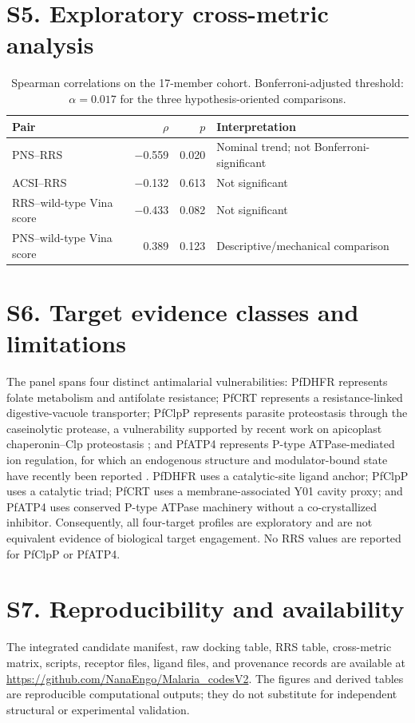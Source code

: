 \documentclass[journal=jcisd8,manuscript=suppinfo]{achemso}
\begin{document}
\section*{S5. Exploratory cross-metric analysis}
\begin{table}[h]
\centering
\caption{Spearman correlations on the 17-member cohort. Bonferroni-adjusted threshold: $\alpha=\num{0.017}$ for the three hypothesis-oriented comparisons.}
\label{tab:crossmetric}
\begin{tabular}{@{}lrrl@{}}
\toprule
Pair & $\rho$ & $p$ & Interpretation \\
\midrule
PNS--RRS & \num{-0.559} & \num{0.020} & Nominal trend; not Bonferroni-significant \\
ACSI--RRS & \num{-0.132} & \num{0.613} & Not significant \\
RRS--wild-type Vina score & \num{-0.433} & \num{0.082} & Not significant \\
PNS--wild-type Vina score & \num{0.389} & \num{0.123} & Descriptive/mechanical comparison \\
\bottomrule
\end{tabular}
\end{table}

\section*{S6. Target evidence classes and limitations}
The panel spans four distinct antimalarial vulnerabilities: PfDHFR represents folate metabolism and antifolate resistance; PfCRT represents a resistance-linked digestive-vacuole transporter; PfClpP represents parasite proteostasis through the caseinolytic protease, a vulnerability supported by recent work on apicoplast chaperonin--Clp proteostasis \cite{Tissawak2025}; and PfATP4 represents P-type ATPase-mediated ion regulation, for which an endogenous structure and modulator-bound state have recently been reported \cite{Haile2025}. PfDHFR uses a catalytic-site ligand anchor; PfClpP uses a catalytic triad; PfCRT uses a membrane-associated Y01 cavity proxy; and PfATP4 uses conserved P-type ATPase machinery without a co-crystallized inhibitor. Consequently, all four-target profiles are exploratory and are not equivalent evidence of biological target engagement. No RRS values are reported for PfClpP or PfATP4.

\section*{S7. Reproducibility and availability}
The integrated candidate manifest, raw docking table, RRS table, cross-metric matrix, scripts, receptor files, ligand files, and provenance records are available at \url{https://github.com/NanaEngo/Malaria_codesV2}. The figures and derived tables are reproducible computational outputs; they do not substitute for independent structural or experimental validation.
\end{document}
